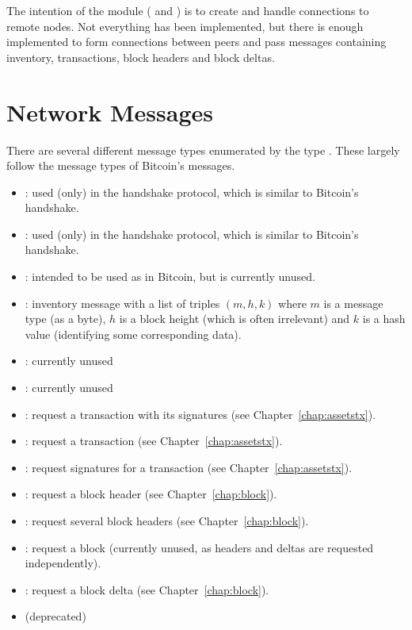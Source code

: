 The intention of the {} module ({} and {}) is to create and handle connections
to remote nodes.
Not everything has been implemented, but there is enough implemented
to form connections between peers and pass messages containing inventory,
transactions, block headers and block deltas.

\section{Network Messages}

There are several different message types enumerated by the type {}.
These largely follow the message types of Bitcoin's messages.
\begin{itemize}
\item {}: used (only) in the handshake protocol, which is similar to Bitcoin's handshake.
\item {}: used (only) in the handshake protocol, which is similar to Bitcoin's handshake.
\item {}: intended to be used as in Bitcoin, but is currently unused.
\item {}: inventory message with a list of triples $(m,h,k)$ where $m$ is a message type (as a byte), $h$ is a block height (which is often irrelevant) and $k$ is a hash value (identifying some corresponding data).
\item {}: currently unused
\item {}: currently unused
\item {}: request a transaction with its signatures (see Chapter~\ref{chap:assetstx}).
\item {}: request a transaction (see Chapter~\ref{chap:assetstx}).
\item {}: request signatures for a transaction (see Chapter~\ref{chap:assetstx}).
\item {}: request a block header (see Chapter~\ref{chap:block}).
\item {}: request several block headers (see Chapter~\ref{chap:block}).
\item {}: request a block (currently unused, as headers and deltas are requested independently).
\item {}: request a block delta (see Chapter~\ref{chap:block}).
\item {} (deprecated)

\end{itemize}
